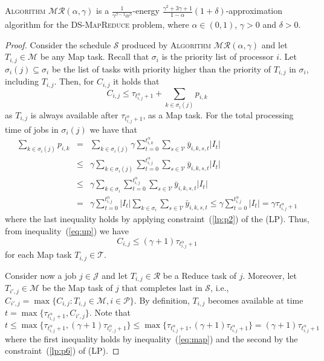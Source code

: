 \documentclass{llncs}
\newcommand{\dmr}{\textsc{DS-MapReduce}\xspace}
\newcommand{\algomr}{\textsc{Algorithm} $\mathcal{MR}(\alpha,\gamma)$\xspace}
\begin{document}
\begin{theorem}
\algomr is a $\frac{1}{\gamma^{\beta-1}\alpha^{\beta}}$-energy $\frac{\gamma^2+3\gamma+1}{1-\alpha}(1+\delta)$-approximation algorithm for the \dmr problem,
where $\alpha\in(0,1)$, $\gamma>0$ and $\delta>0$.
\label{thm:main}
\end{theorem}
\begin{proof}
Consider the schedule $\mathcal{S}$ produced by \algomr and let $T_{i,j} \in \mathcal{M}$ be any Map task.
Recall that $\sigma_i$ is the priority list of processor $i$.
Let $\sigma_i(j) \subseteq \sigma_i$ be the list of tasks with priority higher than the priority of $T_{i,j}$ in $\sigma_i$, including $T_{i,j}$.
Then, for $C_{i,j}$ it holds that
\begin{equation}
C_{i,j} \leq \tau_{t_{i,j}^{\alpha}+1} + \sum_{k\in\sigma_i(j)}p_{i,k} \label{eq:up}
\end{equation}
as $T_{i,j}$ is always available after $\tau_{t_{i,j}^{\alpha}+1}$, as a Map task.
For the total processing time of jobs in $\sigma_i(j)$ we have that
\begin{eqnarray*}
\sum_{k\in\sigma_i(j)}p_{i,k}
 & = & \sum_{k\in\sigma_i(j)} \gamma \sum_{t=0}^{t_{i,k}^{\alpha}} \sum_{s\in\mathcal{V}} \bar{y}_{i,k,s,t}|I_t|\\
 & \leq & \gamma \sum_{k\in\sigma_i(j)} \sum_{t=0}^{t_{i,j}^{\alpha}} \sum_{s\in\mathcal{V}} \bar{y}_{i,k,s,t}|I_t| \\
 & \leq & \gamma \sum_{k\in\sigma_i} \sum_{t=0}^{t_{i,j}^{\alpha}} \sum_{s\in\mathcal{V}} \bar{y}_{i,k,s,t}|I_t|\\
 & = & \gamma \sum_{t=0}^{t_{i,j}^{\alpha}}|I_t| \sum_{k\in\sigma_i} \sum_{s\in\mathcal{V}} \bar{y}_{i,k,s,t}
 \leq \gamma \sum_{t=0}^{t_{i,j}^{\alpha}} |I_t|
 = \gamma \tau_{t_{i,j}^{\alpha}+1}
\end{eqnarray*}
where the last inequality holds by applying constraint~(\ref{lp:p2}) of the (LP).
Thus, from inequality~(\ref{eq:up}) we have
\begin{equation}
C_{i,j} \leq (\gamma+1)\tau_{t_{i,j}^{\alpha}+1} \label{eq:map}
\end{equation}
for each Map task $T_{i,j} \in \mathcal{T}$.

Consider now a job $j \in \mathcal{J}$ and let $T_{i,j} \in \mathcal{R}$ be a Reduce task of $j$.
Moreover, let $T_{i',j} \in \mathcal{M}$ be the Map task of $j$ that completes last in $\mathcal{S}$,
i.e., $C_{i',j}=\max\{C_{i,j}:T_{i,j}\in \mathcal{M}, i \in \mathcal{P}\}$.
By definition, $T_{i,j}$ becomes available at time $t=\max\{\tau_{t_{i,j}^{\alpha}+1},C_{i',j}\}$.
Note that
\begin{equation*}
t \leq \max\{\tau_{t_{i,j}^{\alpha}+1},(\gamma+1)\tau_{t_{i',j}^{\alpha}+1}\}
\leq \max\{\tau_{t_{i,j}^{\alpha}+1},(\gamma+1)\tau_{t_{i,j}^{\alpha}+1}\}
= (\gamma+1)\tau_{t_{i,j}^{\alpha}+1}
\end{equation*}
where the first inequality holds by inequality~(\ref{eq:map}) and the second by the constraint~(\ref{lp:p6}) of (LP).


\end{proof}
\end{document}
